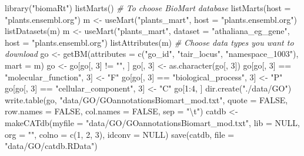 \documentclass[14pt,]{article}
\newcommand{\hlnum}[1]{\textcolor[rgb]{0.816,0.125,0.439}{#1}}%
\newcommand{\hlstr}[1]{\textcolor[rgb]{0.251,0.627,0.251}{#1}}%
\newcommand{\hlcom}[1]{\textcolor[rgb]{0.502,0.502,0.502}{\textit{#1}}}%
\newcommand{\hlopt}[1]{\textcolor[rgb]{0,0,0}{#1}}%
\newcommand{\hlstd}[1]{\textcolor[rgb]{0.251,0.251,0.251}{#1}}%
\newcommand{\hlkwc}[1]{\textcolor[rgb]{0.251,0.251,0.251}{#1}}%
\newcommand{\hlkwd}[1]{\textcolor[rgb]{0.878,0.439,0.125}{#1}}%
\newenvironment{Shaded}{\begin{myshaded}}{\end{myshaded}}
\newcommand{\KeywordTok}[1]{\hlkwd{#1}}
\newcommand{\DataTypeTok}[1]{\hlkwc{#1}}
\newcommand{\DecValTok}[1]{\hlnum{#1}}
\newcommand{\CharTok}[1]{\hlstr{#1}}
\newcommand{\StringTok}[1]{\hlstr{#1}}
\newcommand{\CommentTok}[1]{\hlcom{#1}}
\newcommand{\OtherTok}[1]{{#1}}
\newcommand{\OperatorTok}[1]{\hlopt{#1}}
\newcommand{\NormalTok}[1]{\hlstd{#1}}
\begin{document}
\begin{Shaded}
\begin{Highlighting}[]
\KeywordTok{library}\NormalTok{(}\StringTok{"biomaRt"}\NormalTok{)}
\KeywordTok{listMarts}\NormalTok{()  }\CommentTok{# To choose BioMart database}
\KeywordTok{listMarts}\NormalTok{(}\DataTypeTok{host =} \StringTok{"plants.ensembl.org"}\NormalTok{)}
\NormalTok{m <-}\StringTok{ }\KeywordTok{useMart}\NormalTok{(}\StringTok{"plants_mart"}\NormalTok{, }\DataTypeTok{host =} \StringTok{"plants.ensembl.org"}\NormalTok{)}
\KeywordTok{listDatasets}\NormalTok{(m)}
\NormalTok{m <-}\StringTok{ }\KeywordTok{useMart}\NormalTok{(}\StringTok{"plants_mart"}\NormalTok{, }\DataTypeTok{dataset =} \StringTok{"athaliana_eg_gene"}\NormalTok{, }\DataTypeTok{host =} \StringTok{"plants.ensembl.org"}\NormalTok{)}
\KeywordTok{listAttributes}\NormalTok{(m)  }\CommentTok{# Choose data types you want to download}
\NormalTok{go <-}\StringTok{ }\KeywordTok{getBM}\NormalTok{(}\DataTypeTok{attributes =} \KeywordTok{c}\NormalTok{(}\StringTok{"go_id"}\NormalTok{, }\StringTok{"tair_locus"}\NormalTok{, }\StringTok{"namespace_1003"}\NormalTok{), }\DataTypeTok{mart =}\NormalTok{ m)}
\NormalTok{go <-}\StringTok{ }\NormalTok{go[go[, }\DecValTok{3}\NormalTok{] }\OperatorTok{!=}\StringTok{ ""}\NormalTok{, ]}
\NormalTok{go[, }\DecValTok{3}\NormalTok{] <-}\StringTok{ }\KeywordTok{as.character}\NormalTok{(go[, }\DecValTok{3}\NormalTok{])}
\NormalTok{go[go[, }\DecValTok{3}\NormalTok{] }\OperatorTok{==}\StringTok{ "molecular_function"}\NormalTok{, }\DecValTok{3}\NormalTok{] <-}\StringTok{ "F"}
\NormalTok{go[go[, }\DecValTok{3}\NormalTok{] }\OperatorTok{==}\StringTok{ "biological_process"}\NormalTok{, }\DecValTok{3}\NormalTok{] <-}\StringTok{ "P"}
\NormalTok{go[go[, }\DecValTok{3}\NormalTok{] }\OperatorTok{==}\StringTok{ "cellular_component"}\NormalTok{, }\DecValTok{3}\NormalTok{] <-}\StringTok{ "C"}
\NormalTok{go[}\DecValTok{1}\OperatorTok{:}\DecValTok{4}\NormalTok{, ]}
\KeywordTok{dir.create}\NormalTok{(}\StringTok{"./data/GO"}\NormalTok{)}
\KeywordTok{write.table}\NormalTok{(go, }\StringTok{"data/GO/GOannotationsBiomart_mod.txt"}\NormalTok{, }\DataTypeTok{quote =} \OtherTok{FALSE}\NormalTok{, }\DataTypeTok{row.names =} \OtherTok{FALSE}\NormalTok{, }
    \DataTypeTok{col.names =} \OtherTok{FALSE}\NormalTok{, }\DataTypeTok{sep =} \StringTok{"}\CharTok{\textbackslash{}t}\StringTok{"}\NormalTok{)}
\NormalTok{catdb <-}\StringTok{ }\KeywordTok{makeCATdb}\NormalTok{(}\DataTypeTok{myfile =} \StringTok{"data/GO/GOannotationsBiomart_mod.txt"}\NormalTok{, }\DataTypeTok{lib =} \OtherTok{NULL}\NormalTok{, }\DataTypeTok{org =} \StringTok{""}\NormalTok{, }
    \DataTypeTok{colno =} \KeywordTok{c}\NormalTok{(}\DecValTok{1}\NormalTok{, }\DecValTok{2}\NormalTok{, }\DecValTok{3}\NormalTok{), }\DataTypeTok{idconv =} \OtherTok{NULL}\NormalTok{)}
\KeywordTok{save}\NormalTok{(catdb, }\DataTypeTok{file =} \StringTok{"data/GO/catdb.RData"}\NormalTok{)}
\end{Highlighting}
\end{Shaded}
\end{document}
